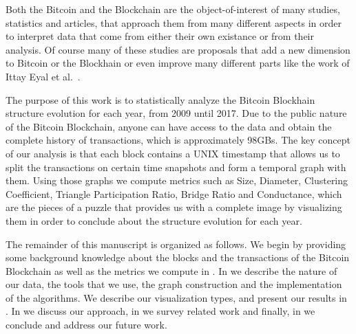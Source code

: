 Both the Bitcoin and the Blockchain are the object-of-interest of many studies, statistics and articles, that approach them from many different aspects in order to interpret data that come from either their own existance or from their analysis. Of course many of these studies are proposals that add a new dimension to Bitcoin or the Blockhain or even improve many different parts like the work of Ittay Eyal et al.~\cite{bitcoin-ng}.

The purpose of this work is to statistically analyze the Bitcoin Blockhain
structure evolution for each year, from 2009 until 2017. Due to the public
nature of the Bitcoin Blockchain, anyone can have access to the data and obtain
the complete history of transactions, which is approximately 98GBs. The key
concept of our analysis is that each block contains a UNIX timestamp that
allows us to split the transactions on certain time snapshots and form a
temporal graph with them. Using those graphs we compute metrics such as Size,
Diameter, Clustering Coefficient, Triangle Participation Ratio, Bridge Ratio
and Conductance, which are the pieces of a puzzle that provides us with a
complete image by visualizing them in order to conclude about 
the structure evolution for each year. 

The remainder of this manuscript is organized as follows. We begin by providing some background knowledge about the blocks and the transactions of the Bitcoin Blockchain as well as the metrics we compute in . In  we describe the nature of our data, the tools that we use, the graph construction and the implementation of the algorithms. We describe our visualization types, and present our results in . In  we discuss our approach, in  we survey related work and finally, in  we conclude and address our future work.
